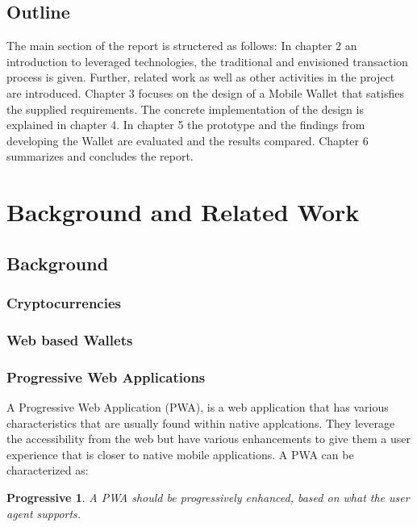 \documentclass[a4paper]{article}
\begin{document}
\subsection{Outline}
The main section of the report is structered as follows:
In chapter 2 an introduction to leveraged technologies, the traditional and envisioned transaction process is given. Further, related work  as well as other activities in the project are introduced. Chapter 3 focuses on the design of a Mobile Wallet that satisfies the supplied requirements. The concrete implementation of the design is explained in chapter 4. In chapter 5 the prototype and the findings from developing the Wallet are evaluated and the results compared.
Chapter 6 summarizes and concludes the report.
\newpage

\section{Background and Related Work}
\subsection{Background}
\subsubsection{Cryptocurrencies}
\subsubsection{Web based Wallets}
\subsubsection{Progressive Web Applications}
A Progressive Web Application (PWA), is a web application that has various characteristics that are usually found within native applcations.
They leverage the accessibility from the web but have various enhancements to give them a user experience that is closer to native mobile applications.
A PWA can be characterized as:
\newtheorem{theorem-progressive}{Progressive}
\newtheorem{theorem}{Connectivity Independent}
\newtheorem{theorem-install}{Installable}
\newtheorem{theorem-secure}{Secure}

\begin{theorem-progressive}
A PWA should be progressively enhanced, based on what the user agent supports.
\end{theorem-progressive}
\end{document}
